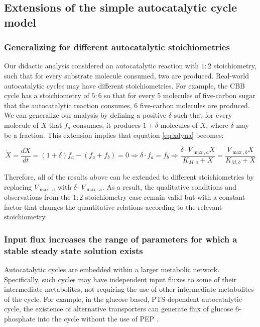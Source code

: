 \subsection{Extensions of the simple autocatalytic cycle model}
    \subsubsection{Generalizing for different autocatalytic stoichiometries}
    Our didactic analysis considered an autocatalytic reaction with $1\mathbin{:}2$ stoichiometry, such that for every substrate molecule consumed, two are produced.
    Real-world autocatalytic cycles may have different stoichiometries.
    For example, the CBB cycle has a stoichiometry of $5\mathbin{:}6$ so that for every 5 molecules of five-carbon sugar that the autocatalytic reaction consumes, 6 five-carbon molecules are produced.
    We can generalize our analysis by defining a positive $\delta$ such that for every molecule of $X$ that $f_a$ consumes, it produces $1+\delta$ molecules of $X$, where $\delta$ may be a fraction.
    This extension implies that equation \eqref{eq:xdyna} becomes:

    \begin{equation*}
      \dot X = \frac{dX}{dt} = (1+\delta)f_a - (f_a + f_b) = 0 \Rightarrow \delta \cdot f_a = f_b \Rightarrow \frac{\delta \cdot V_{\max,a}X}{K_{M,a}+X}=\frac{V_{\max,b}X}{K_{M,b}+X}
    \end{equation*}

    Therefore, all of the results above can be extended to different stoichiometries by replacing $V_{\max,a}$ with $\delta \cdot V_{\max,a}$.
    As a result, the qualitative conditions and observations from the $1\mathbin{:}2$ stoichiometry case remain valid but with a constant factor that changes the quantitative relations according to the relevant stoichiometry.
\subsubsection{Input flux increases the range of parameters for which a stable steady state solution exists}
    Autocatalytic cycles are embedded within a larger metabolic network.
    Specifically, such cycles may have independent input fluxes to some of their intermediate metabolites, not requiring the use of other intermediate metabolites of the cycle.
    For example, in the glucose based, PTS-dependent autocatalytic cycle, the existence of alternative transporters can generate flux of glucose 6-phosphate into the cycle without the use of PEP \cite{Ferenci1996-nv}.

